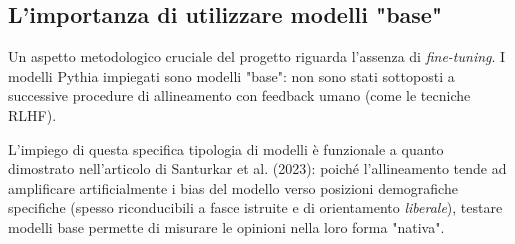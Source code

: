 \documentclass[../relazione.tex]{subfiles}
\begin{document}
\subsection{L'importanza di utilizzare modelli "base"}

Un aspetto metodologico cruciale del progetto riguarda l'assenza di \emph{fine-tuning}. I modelli Pythia impiegati sono modelli "base": non sono stati sottoposti a successive procedure di allineamento con feedback umano (come le tecniche RLHF). 

L'impiego di questa specifica tipologia di modelli è funzionale a quanto dimostrato nell'articolo di Santurkar et al. (2023): poiché l'allineamento tende ad amplificare artificialmente i bias del modello verso posizioni demografiche specifiche (spesso riconducibili a fasce istruite e di orientamento \emph{liberale}), testare modelli base permette di misurare le opinioni nella loro forma "nativa". 
\end{document}
